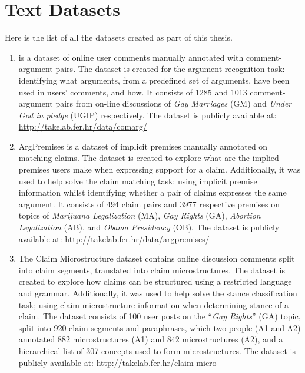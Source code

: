 \chapter{Text Datasets}
\label{chap:appendix_datasets}

Here is the list of all the datasets created as part of this thesis.

\begin{enumerate}[label=\textbf{A.\arabic*}]
\item\label{item:comarg} \ComArg is a dataset of online user comments manually annotated with
comment-argument pairs. The dataset is created for the argument
recognition task: identifying what arguments, from a predefined
set of arguments, have been used in users' comments, and how.
It consists of 1285 and 1013 comment-argument pairs from 
on-line discussions of \emph{Gay Marriages} (GM) 
and \emph{Under God in pledge} (UGIP) respectively.
The dataset is publicly available at:
\url{http://takelab.fer.hr/data/comarg/}

\item\label{item:argpremises} ArgPremises is a dataset of 
implicit premises manually annotated on matching claims. 
The dataset is created to explore what are the implied premises users 
make when expressing support for a claim.
Additionally, it was used to help solve the claim matching task; 
using implicit premise information whilst 
identifying whether a pair of claims expresses the same argument. 
It consists of 494 claim pairs and 3977 respective premises on topics
of \emph{Marijuana Legalization} (MA), \emph{Gay Rights} (GA), 
\emph{Abortion Legalization} (AB),
and \emph{Obama Presidency} (OB).
The dataset is publicly available at:
\url{http://takelab.fer.hr/data/argpremises/}

\item\label{item:microstructures_dataset} 
The Claim Microstructure dataset contains online
discussion comments split into claim
segments, translated into claim microstructures. The dataset is created
to explore how claims can be structured using a restricted
language and grammar. Additionally, it was used to help solve
the stance classification task; using claim microstructure
information when determining stance of a claim. 
The dataset consists of 
100 user posts on the ``\emph{Gay Rights}'' (GA) topic, 
split into 920 claim segments and paraphrases, which two people
(A1 and A2) annotated
882 microstructures (A1) and 842 microstructures (A2), and a hierarchical 
list of 307 concepts used to form microstructures. 
The dataset is publicly available at:
\url{http://takelab.fer.hr/claim-micro}


\end{enumerate}
